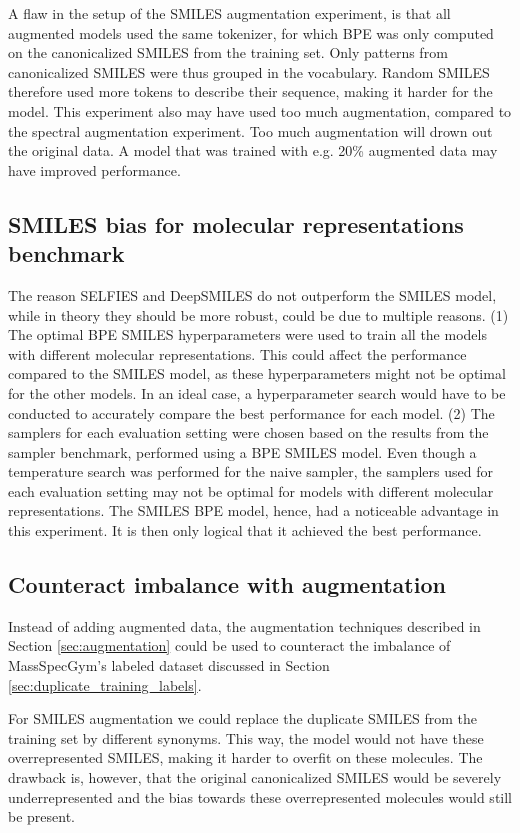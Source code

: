 A flaw in the setup of the SMILES augmentation experiment, is that all augmented models used the same tokenizer, for which \ac{BPE} was only computed on the canonicalized SMILES from the training set.
Only patterns from canonicalized SMILES were thus grouped in the vocabulary.
Random SMILES therefore used more tokens to describe their sequence, making it harder for the model.
This experiment also may have used too much augmentation, compared to the spectral augmentation experiment.
Too much augmentation will drown out the original data.
A model that was trained with e.g. 20\% augmented data may have improved performance.

\subsection{SMILES bias for molecular representations benchmark}

The reason SELFIES and DeepSMILES do not outperform the SMILES model, while in theory they should be more robust, could be due to multiple reasons.
(1) The optimal \ac{BPE} SMILES hyperparameters were used to train all the models with different molecular representations.
This could affect the performance compared to the SMILES model, as these hyperparameters might not be optimal for the other models.
In an ideal case, a hyperparameter search would have to be conducted to accurately compare the best performance for each model.
(2) The samplers for each evaluation setting were chosen based on the results from the sampler benchmark, performed using a \ac{BPE} SMILES model.
Even though a temperature search was performed for the naive sampler,
the samplers used for each evaluation setting may not be optimal for models with different molecular representations.
The SMILES \ac{BPE} model, hence, had a noticeable advantage in this experiment. It is then only logical that it achieved the best performance.


\subsection{Counteract imbalance with augmentation}

Instead of adding augmented data, the augmentation techniques described in Section \ref{sec:augmentation} could be used to counteract the imbalance of MassSpecGym's labeled dataset discussed in Section \ref{sec:duplicate_training_labels}.

For SMILES augmentation we could replace the duplicate SMILES from the training set by different synonyms.
This way, the model would not have these overrepresented SMILES, making it harder to overfit on these molecules.
The drawback is, however, that the original canonicalized SMILES would be severely underrepresented and the bias towards these overrepresented molecules would still be present.

